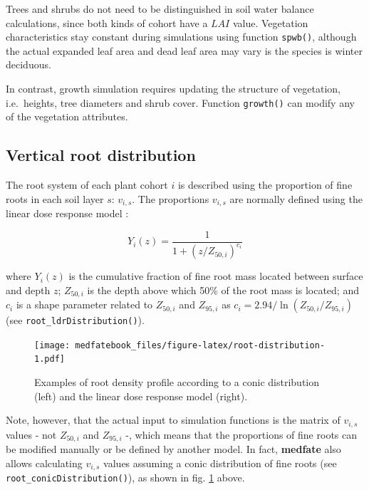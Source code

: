\documentclass[]{book}
\begin{document}
Trees and shrubs do not need to be distinguished in soil water balance
calculations, since both kinds of cohort have a \(LAI\) value.
Vegetation characteristics stay constant during simulations using
function \texttt{spwb()}, although the actual expanded leaf area and
dead leaf area may vary is the species is winter deciduous.

In contrast, growth simulation requires updating the structure of
vegetation, i.e.~heights, tree diameters and shrub cover. Function
\texttt{growth()} can modify any of the vegetation attributes.

\subsection{Vertical root
distribution}\label{vertical-root-distribution}

The root system of each plant cohort \(i\) is described using the
proportion of fine roots in each soil layer \(s\): \(v_{i,s}\). The
proportions \(v_{i,s}\) are normally defined using the linear dose
response model \citep{Schenk2002, Collins2007}:

\begin{equation}
Y_i(z)=\frac{1}{1+(z/Z_{50,i})^{c_i}}
\end{equation}

where \(Y_i(z)\) is the cumulative fraction of fine root mass located
between surface and depth \(z\); \(Z_{50,i}\) is the depth above which
50\% of the root mass is located; and \(c_i\) is a shape parameter
related to \(Z_{50,i}\) and \(Z_{95,i}\) as
\(c_i = 2.94 / \ln(Z_{50,i} / Z_{95,i})\) (see
\texttt{root\_ldrDistribution()}).

\begin{figure}
\centering
\texttt{[image: medfatebook\_files/figure-latex/root-distribution-1.pdf]}
\caption{\label{fig:root-distribution}Examples of root density profile
according to a conic distribution (left) and the linear dose response
model (right).}
\end{figure}

Note, however, that the actual input to simulation functions is the
matrix of \(v_{i,s}\) values - not \(Z_{50,i}\) and \(Z_{95,i}\) -,
which means that the proportions of fine roots can be modified manually
or be defined by another model. In fact, \textbf{medfate} also allows
calculating \(v_{i,s}\) values assuming a conic distribution of fine
roots (see \texttt{root\_conicDistribution()}), as shown in fig.
\ref{fig:root-distribution} above.
\end{document}

